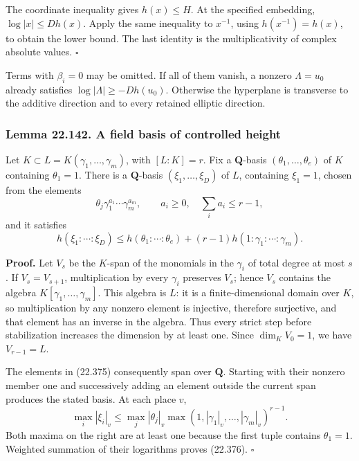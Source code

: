 \documentclass[
  11pt,
  a4paper,
]{article}
\begin{document}
The coordinate inequality gives \(h(x)\le H\). At the specified
embedding, \(\log|x|\le D h(x)\). Apply the same inequality to
\(x^{-1}\), using \(h(x^{-1})=h(x)\), to obtain the lower bound. The
last identity is the multiplicativity of complex absolute values.
\(\square\)

Terms with \(\beta_i=0\) may be omitted. If all of them vanish, a
nonzero \(\Lambda=u_0\) already satisfies \(\log|\Lambda|\ge-Dh(u_0)\).
Otherwise the hyperplane is transverse to the additive direction and to
every retained elliptic direction.

\subsubsection{Lemma 22.142. A field basis of controlled
height}\label{lemma-22.142.-a-field-basis-of-controlled-height}

Let \(K\subset L=K(\gamma_1,\ldots,\gamma_m)\), with \([L:K]=r\). Fix a
\(\mathbf Q\)-basis \((\theta_1,\ldots,\theta_e)\) of \(K\) containing
\(\theta_1=1\). There is a \(\mathbf Q\)-basis \((\xi_1,\ldots,\xi_D)\)
of \(L\), containing \(\xi_1=1\), chosen from the elements \[
 \theta_j\gamma_1^{a_1}\cdots\gamma_m^{a_m},
 \qquad a_i\ge0,\quad \sum_i a_i\le r-1,
 \tag{22.375}
\] and it satisfies \[
 h(\xi_1:\cdots:\xi_D)
 \le h(\theta_1:\cdots:\theta_e)
       +(r-1)h(1:\gamma_1:\cdots:\gamma_m).
 \tag{22.376}
\]

\textbf{Proof.} Let \(V_s\) be the \(K\)-span of the monomials in the
\(\gamma_i\) of total degree at most \(s\). If \(V_s=V_{s+1}\),
multiplication by every \(\gamma_i\) preserves \(V_s\); hence \(V_s\)
contains the algebra \(K[\gamma_1,\ldots,\gamma_m]\). This algebra is
\(L\): it is a finite-dimensional domain over \(K\), so multiplication
by any nonzero element is injective, therefore surjective, and that
element has an inverse in the algebra. Thus every strict step before
stabilization increases the dimension by at least one. Since
\(\dim_K V_0=1\), we have \(V_{r-1}=L\).

The elements in (22.375) consequently span over \(\mathbf Q\). Starting
with their nonzero member one and successively adding an element outside
the current span produces the stated basis. At each place \(v\), \[
 \max_i|\xi_i|_v\le
 \max_j|\theta_j|_v
           \max(1,|\gamma_1|_v,\ldots,|\gamma_m|_v)^{r-1}.
 \tag{22.377}
\] Both maxima on the right are at least one because the first tuple
contains \(\theta_1=1\). Weighted summation of their logarithms proves
(22.376). \(\square\)
\end{document}
